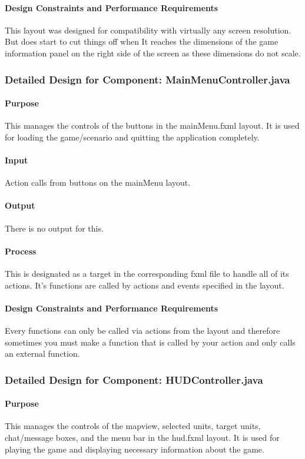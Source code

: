 \documentclass[12pt,a4paper,titlepage]{article}
\begin{document}
\paragraph{Design Constraints and Performance Requirements}	This layout was designed for compatibility with virtually any screen resolution.  But does start to cut things off when It reaches the dimensions of the game information panel on the right side of the screen as these dimensions do not scale.

\subsubsection{Detailed Design for Component: MainMenuController.java}
\paragraph{Purpose} This manages the controls of the buttons in the mainMenu.fxml layout.  It is used for loading the game/scenario and quitting the application completely.
\paragraph{Input} Action calls from buttons on the mainMenu layout.
\paragraph{Output} There is no output for this.
\paragraph{Process} This is designated as a target in the corresponding fxml file to handle all of its actions.  It’s functions are called by actions and events specified in the layout.
\paragraph{Design Constraints and Performance Requirements}	 Every functions can only be called via actions from the layout and therefore sometimes you must make a function that  is called by your action and only calls an external function.

\subsubsection{Detailed Design for Component: HUDController.java}
\paragraph{Purpose} This manages the controls of the mapview, selected units, target units, chat/message boxes, and the menu bar in the hud.fxml layout.  It is used for playing the game and displaying necessary information about the game.
\end{document}
